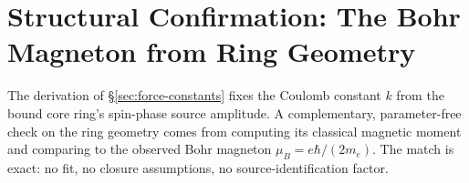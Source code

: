 %
%

\section{Structural Confirmation: The Bohr Magneton from Ring Geometry}
\label{sec:bohr-magneton}

The derivation of §\ref{sec:force-constants} fixes the Coulomb constant
$k$ from the bound core ring's spin-phase source amplitude. A
complementary, parameter-free check on the ring geometry comes from
computing its classical magnetic moment and comparing to the observed
Bohr magneton $\mu_B = e\hbar/(2m_e)$. The match is exact: no fit,
no closure assumptions, no source-identification factor.

